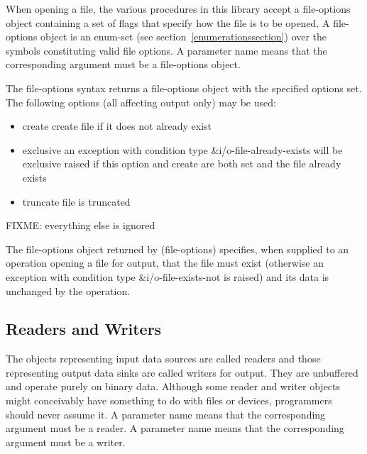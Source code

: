 When opening a file, the various procedures in this library accept a
{\cf file-options} object containing a set of flags that specify how
the file is to be opened. A {\cf file-options} object is an enum-set
(see section~\ref{enumerationssection}) over the symbols constituting
valid file options.
A  parameter name means that the
corresponding argument must be a file-options object.

\begin{entry}{%
}
   
The {\cf file-options} syntax returns a file-options object with the
specified options set. The following options (all affecting output
only) may be used:

\begin{itemize}   
\item {\cf create} create file if it does not already exist
\item {\cf exclusive} an exception with condition type
  {\cf\&i/o-file-already-exists} will be exclusive raised if this
  option and {\cf create} are both set and the file already exists
\item {\cf truncate}
  file is truncated
\end{itemize}

FIXME: everything else is ignored

The file-options object returned by {\cf (file-options)} specifies,
when supplied to an operation opening a file for output, that the file
must exist (otherwise an exception with condition type
{\cf\&i/o-file-exists-not} is raised) and its data is unchanged by the
operation.
\end{entry}   

\subsection{Readers and Writers}

The objects representing input data sources are called readers and
those representing output data sinks are called writers for output.
They are unbuffered and operate purely on binary data.  Although some
reader and writer objects might conceivably have something to do with
files or devices, programmers should never assume it.
A  parameter name means that the
corresponding argument must be a reader.
A  parameter name means that the
corresponding argument must be a writer.

